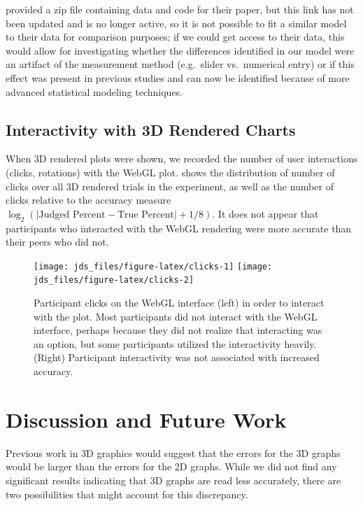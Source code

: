 \documentclass[letterpaper,inpress,dvipsnames]{jdsart}
\begin{document}
\citeauthor{heerCrowdsourcingGraphicalPerception2010b} provided a zip file containing data and code for their paper, but this link has not been updated and is no longer active, so it is not possible to fit a similar model to their data for comparison purposes; if we could get access to their data, this would allow for investigating whether the differences identified in our model were an artifact of the measurement method (e.g.~slider vs.~numerical entry) or if this effect was present in previous studies and can now be identified because of more advanced statistical modeling techniques.

\hypertarget{interactivity-with-3d-rendered-charts}{%
\subsection{Interactivity with 3D Rendered Charts}\label{interactivity-with-3d-rendered-charts}}

When 3D rendered plots were shown, we recorded the number of user interactions (clicks, rotations) with the WebGL plot.  shows the distribution of number of clicks over all 3D rendered trials in the experiment, as well as the number of clicks relative to the accuracy measure \(\log_2(|\text{Judged Percent} - \text{True Percent}|+1/8)\). It does not appear that participants who interacted with the WebGL rendering were more accurate than their peers who did not.

\begin{figure}
\texttt{[image: jds\_files/figure-latex/clicks-1]} \texttt{[image: jds\_files/figure-latex/clicks-2]} \caption{Participant clicks on the WebGL interface (left) in order to interact with the plot. Most participants did not interact with the WebGL interface, perhaps because they did not realize that interacting was an option, but some participants utilized the interactivity heavily. (Right) Participant interactivity was not associated with increased accuracy.}\label{fig:clicks}
\end{figure}

\hypertarget{discussion-and-future-work}{%
\section{Discussion and Future Work}\label{discussion-and-future-work}}

Previous work in 3D graphics would suggest that the errors for the 3D graphs would be larger than the errors for the 2D graphs.
While we did not find any significant results indicating that 3D graphs are read less accurately, there are two possibilities that might account for this discrepancy.
\end{document}

